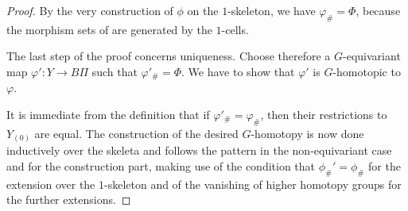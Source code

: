 \documentclass[10pt,a4paper]{amsart}
\begin{document}
\begin{proof}
		By the very construction of $\phi$ on the $1$-skeleton, we have
		$\varphi_{\#}=\Phi$, because the morphism sets of
		 are
		generated by the $1$-cells.
		
		The last step of the proof concerns uniqueness. Choose therefore a
		$G$-equivariant map
		$\varphi'\colon Y \to B \Pi$ such that
		$\varphi'_{\#}=\Phi$. We have to show that $\varphi'$ is $G$-homotopic to
		$\varphi$.
		
		It is immediate from the definition that if $\varphi'_{\#}=\varphi_{\#}$, then
		their restrictions to $Y_{(0)}$ are equal. The construction of the desired
		$G$-homotopy is now done inductively over the skeleta and follows the pattern
		in the non-equivariant case and for the construction part, making use of the
		condition that $\phi_\#'=\phi_\#$ for the extension over the $1$-skeleton and
		of the vanishing of higher homotopy groups for the further extensions.
	\end{proof}
\end{document}
